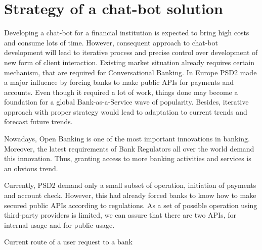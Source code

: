 
\section{Strategy of a chat-bot solution}

Developing a chat-bot for a financial institution is expected to bring high costs and consume lots of time.
However, consequent approach to chat-bot development will lead to iterative process and precise control over development of new form of client interaction.
Existing market situation already requires certain mechanism, that are required for Conversational Banking.
In Europe PSD2 made a major influence by forcing banks to make public APIs for payments and accounts.
Even though it required a lot of work, things done may become a foundation for a global Bank-as-a-Service wave of popularity.
Besides, iterative approach with proper strategy would lead to adaptation to current trends and forecast future trends.

Nowadays, Open Banking is one of the most important innovations in banking.
Moreover, the latest requirements of Bank Regulators all over the world demand this innovation. 
Thus, granting access to more banking activities and services is an obvious trend.

Currently, PSD2 demand only a small subset of operation, initiation of payments and account check.
However, this had already forced banks to know how to make secured public APIs according to regulations.
As a set of possible operation using third-party providers is limited, we can assure that there are two APIs, for internal usage and for public usage.

\begin{table}
    \centering
    \caption{Current route of a user request to a bank}
    \medskip
\end{table}


